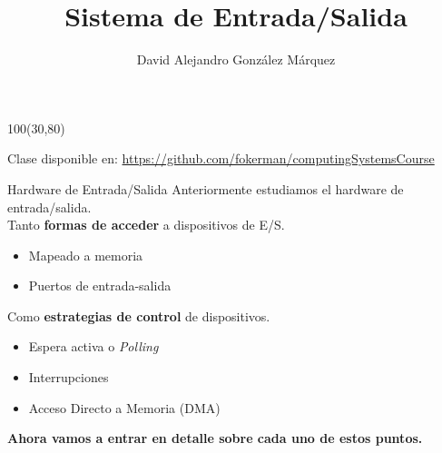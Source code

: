 \documentclass[aspectratio=169]{beamer}
\title{\Huge Sistema de Entrada/Salida}
\author{David Alejandro González Márquez}
\date{}
\begin{document}
\begin{frame}[plain]
    \titlepage
    \begin{textblock}{100}(30,80)
    \begin{tcolorbox}[size=small,width=\textwidth,colback={gray!30},title={}]
    \begin{center}
     \scriptsize Clase disponible en: \url{https://github.com/fokerman/computingSystemsCourse}
    \end{center}
    \end{tcolorbox}
    \end{textblock}
\end{frame}

\begin{frame}{Hardware de Entrada/Salida}
    Anteriormente estudiamos el hardware de entrada/salida.\\
    \bigskip
    Tanto \textcolor{verdeuca}{\textbf{formas de acceder}} a dispositivos de E/S.\\
    \begin{itemize}
    \item Mapeado a memoria
    \item Puertos de entrada-salida
    \end{itemize}
    \bigskip
    Como \textcolor{verdeuca}{\textbf{estrategias de control}} de dispositivos.\\
    \begin{itemize}
    \item Espera activa o \emph{Polling}
    \item Interrupciones
    \item Acceso Directo a Memoria (DMA)
    \end{itemize}
    \begin{center}
     \textcolor{naranjauca}{\textbf{Ahora vamos a entrar en detalle sobre cada uno de estos puntos.}}
    \end{center}
\end{frame}
    
\end{document}
